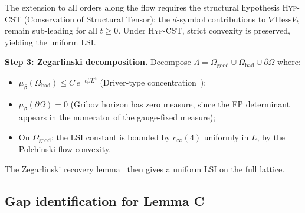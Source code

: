 \documentclass[11pt,a4paper]{amsart}
\theoremstyle{definition}
\theoremstyle{remark}
\newcommand{\Hess}{\mathrm{Hess}}
\newcommand{\cinf}{c_{\infty}}
\begin{document}
The extension to all orders along the flow requires the structural hypothesis
\textsc{Hyp-CST} (Conservation of Structural Tensor): the $d$-symbol
contributions to $\nabla\Hess V_t$ remain sub-leading for all $t \geq 0$.
Under \textsc{Hyp-CST}, strict convexity is preserved, yielding the
uniform LSI.

\medskip
\noindent
\textbf{Step 3: Zegarlinski decomposition.}
Decompose $\overline{\Lambda} = \Omega_{\mathrm{good}} \cup
\Omega_{\mathrm{bad}} \cup \partial\Omega$ where:
\begin{itemize}[leftmargin=2em]
\item $\mu_\beta(\Omega_{\mathrm{bad}}) \leq C\,e^{-c\beta L^4}$
      (Driver-type concentration~\cite{Driver1989});
\item $\mu_\beta(\partial\Omega) = 0$ (Gribov horizon has zero measure,
      since the FP determinant appears in the numerator of the
      gauge-fixed measure);
\item On $\Omega_{\mathrm{good}}$: the LSI constant is bounded by
      $\cinf(4)$ uniformly in $L$, by the Polchinski-flow convexity.
\end{itemize}
The Zegarlinski recovery lemma~\cite{Zegarlinski1996, BGL2014} then
gives a uniform LSI on the full lattice.

\subsection{Gap identification for Lemma C}
\end{document}
